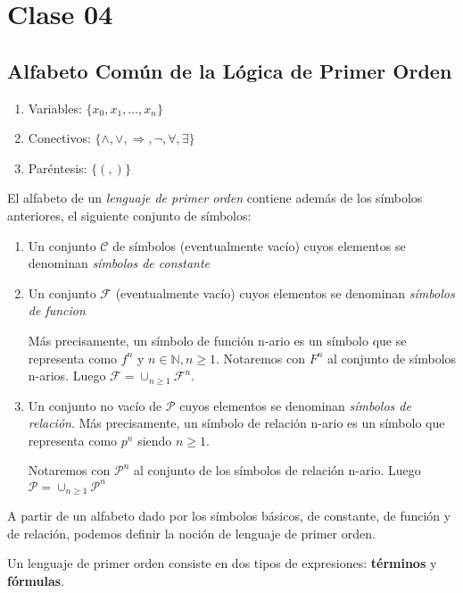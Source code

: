 \section{Clase 04}

\subsection{Alfabeto Com\'un de la L\'ogica de Primer Orden}

\begin{enumerate}
	\item Variables: $\{x_0, x_1, \ldots, x_n\}$
	\item Conectivos: $\{\land, \lor, \Rightarrow, \neg, \forall, \exists \}$
	\item Par\'entesis: $\{ (, ) \}$
\end{enumerate}

El alfabeto de un \textit{lenguaje de primer orden} contiene adem\'as de los s\'imbolos anteriores, el siguiente conjunto de s\'imbolos:

\begin{enumerate}
	\item Un conjunto $\mathcal{C}$ de s\'imbolos (eventualmente vac\'io) cuyos elementos se denominan 				\textit{s\'imbolos de constante}
	\item Un conjunto $\mathcal{F}$ (eventualmente vac\'io) cuyos elementos se denominan \textit{s\'im\-bolos de funcion}
	
	M\'as precisamente, un s\'imbolo de funci\'on n-ario es un s\'imbolo que se representa como $f^n$ y $n \in \mathbb{N}, n \geq 1$. Notaremos con $F^n$ al conjunto de s\'imbolos n-arios. Luego $\mathcal{F} = \cup_{n \geq 1} \mathcal{F}^n$.
	\item Un conjunto no vac\'io de $\mathcal{P}$ cuyos elementos se denominan \textit{s\'imbolos de relaci\'on}. M\'as precisamente, un s\'imbolo de relaci\'on n-ario es un s\'imbolo que representa como $p^n$ siendo $n \geq 1$.
	
	Notaremos con $\mathcal{P}^n$ al conjunto de los s\'imbolos de relaci\'on n-ario. Luego $\mathcal{P} = \cup_{n \geq 1} \mathcal{P}^n$
\end{enumerate}

A partir de un alfabeto dado por los s\'imbolos b\'asicos, de constante, de funci\'on y de relaci\'on, podemos definir la noci\'on de lenguaje de primer orden.

Un lenguaje de primer orden consiste en dos tipos de expresiones: \textbf{t\'erminos} y \textbf{f\'ormulas}.

